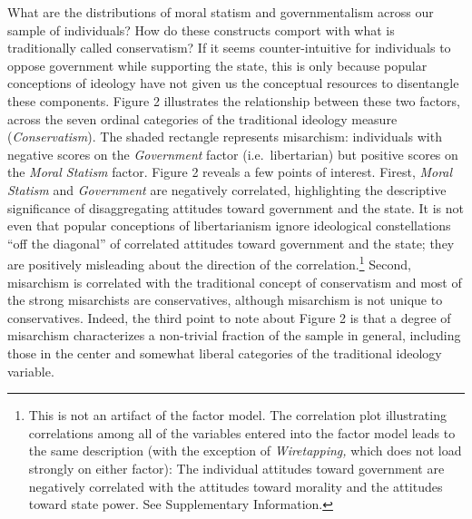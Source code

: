 \documentclass[12pt,]{article}
\let\rmarkdownfootnote\footnote%
\def\footnote{\protect\rmarkdownfootnote}
\begin{document}
What are the distributions of moral statism and governmentalism across
our sample of individuals? How do these constructs comport with what is
traditionally called conservatism? If it seems counter-intuitive for
individuals to oppose government while supporting the state, this is
only because popular conceptions of ideology have not given us the
conceptual resources to disentangle these components. Figure 2
illustrates the relationship between these two factors, across the seven
ordinal categories of the traditional ideology measure
(\emph{Conservatism}). The shaded rectangle represents misarchism:
individuals with negative scores on the \emph{Government} factor
(i.e.~libertarian) but positive scores on the \emph{Moral Statism}
factor. Figure 2 reveals a few points of interest. Firest, \emph{Moral
Statism} and \emph{Government} are negatively correlated, highlighting
the descriptive significance of disaggregating attitudes toward
government and the state. It is not even that popular conceptions of
libertarianism ignore ideological constellations ``off the diagonal'' of
correlated attitudes toward government and the state; they are
positively misleading about the direction of the correlation.\footnote{This
  is not an artifact of the factor model. The correlation plot
  illustrating correlations among all of the variables entered into the
  factor model leads to the same description (with the exception of
  \emph{Wiretapping,} which does not load strongly on either factor):
  The individual attitudes toward government are negatively correlated
  with the attitudes toward morality and the attitudes toward state
  power. See Supplementary Information.} Second, misarchism is
correlated with the traditional concept of conservatism and most of the
strong misarchists are conservatives, although misarchism is not unique
to conservatives. Indeed, the third point to note about Figure 2 is that
a degree of misarchism characterizes a non-trivial fraction of the
sample in general, including those in the center and somewhat liberal
categories of the traditional ideology variable.
\end{document}
